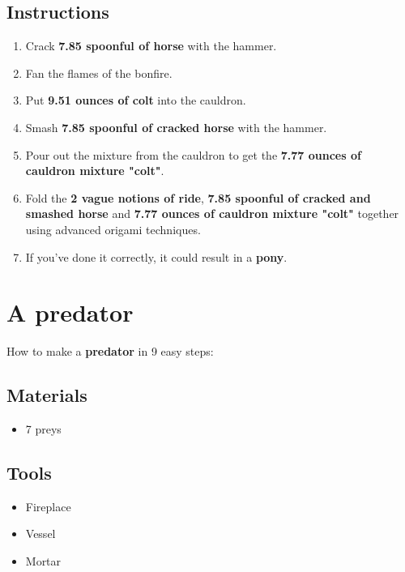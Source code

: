 \documentclass{article}
\begin{document}
\subsection{Instructions}\begin{enumerate}
\item 
Crack \textbf{7.85 spoonful of horse} with the hammer.
\item 
Fan the flames of the bonfire.
\item 
Put \textbf{9.51 ounces of colt} into the cauldron.
\item 
Smash \textbf{7.85 spoonful of cracked horse} with the hammer.
\item 
Pour out the mixture from the cauldron to get the \textbf{7.77 ounces of cauldron mixture "colt"}.
\item 
Fold the \textbf{2 vague notions of ride}, \textbf{7.85 spoonful of cracked and smashed horse} and \textbf{7.77 ounces of cauldron mixture "colt"} together using advanced origami techniques.
\item 
If you've done it correctly, it could result in a \textbf{pony}.
\end{enumerate}
\newpage
\section{A predator}How to make a \textbf{predator} in 9 easy steps:

\subsection{Materials}\begin{itemize}
\item 
7 preys
\end{itemize}
\subsection{Tools}\begin{itemize}
\item 
Fireplace
\item 
Vessel
\item 
Mortar
\end{itemize}
\end{document}
